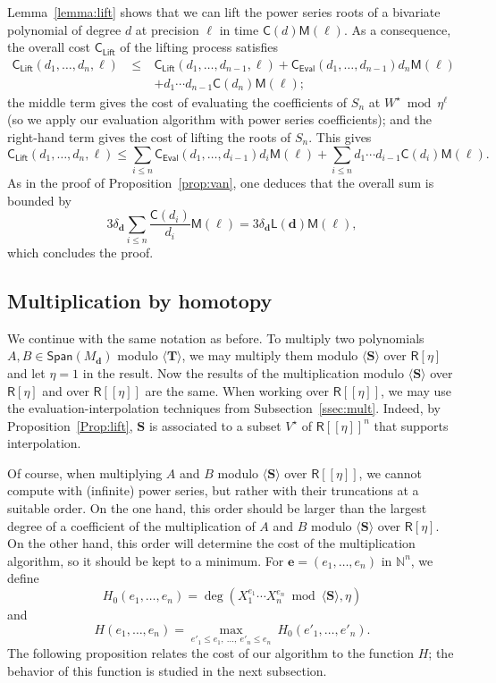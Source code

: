 \documentclass[amsthm]{elsart}
\def\d {\ensuremath{\mathbf{d}}}
\def\e {\ensuremath{\mathbf{e}}}
\def\C {\ensuremath{\mathsf{C}}}
\def\L {\ensuremath{\mathsf{L}}}
\def\N {\ensuremath{\mathbb{N}}}
\def\S {\ensuremath{\mathbf{S}}}
\def\T {\ensuremath{\mathbf{T}}}
\def\M {\ensuremath{\mathsf{M}}}
\def\rng {\ensuremath{\mathsf{R}}}
\def\Span {\ensuremath{\mathsf{Span}}}
\def\Eval {\ensuremath{\mathsf{Eval}}}
\def\Lift {\ensuremath{\mathsf{Lift}}}
\theoremstyle{plain}
\begin{document}
\begin{pf}
Lemma~\ref{lemma:lift} shows that we can lift the power series roots
of a bivariate polynomial of degree $d$ at precision $\ell$ in time
$\C(d)\M(\ell)$. As a consequence, the overall cost $\C_\Lift$ of the
lifting process satisfies
$$
\begin{array}{rcl}
\C_\Lift(d_1,\dots,d_n,\ell) & ~\le~&  
\C_\Lift(d_1,\dots,d_{n-1},\ell) + 
\C_\Eval(d_1,\dots,d_{n-1}) d_n \M(\ell)\\
&&+d_1\cdots d_{n-1} \C(d_n) \M(\ell);
\end{array}
$$
the middle term gives the cost of evaluating the coefficients of $S_n$
at $W^\star \bmod \eta^\ell$ (so we apply our evaluation algorithm
with power series coefficients); and the right-hand term gives the
cost of lifting the roots of $S_n$.  This gives
$$\C_\Lift(d_1,\dots,d_n,\ell)\le 
\sum_{i \le n} \C_\Eval(d_1,\dots,d_{i-1}) d_i \M(\ell) + \sum_{i \le
  n} d_1\cdots d_{i-1} \C(d_i) \M(\ell).$$ As in the proof of
Proposition~\ref{prop:van}, one deduces that the overall sum is bounded by
$$3   \delta_\d\sum_{i \le n} \frac{\C(d_i)}{d_i}\M(\ell)
= 3   \delta_\d \L(\d)\M(\ell),$$
which concludes the proof.
\end{pf}



\subsection{Multiplication by homotopy}\label{ssec:prodEta}

We continue with the same notation as before. To multiply two
polynomials $A,B \in \Span(M_\d)$ modulo $\langle \T \rangle$,
we may multiply them modulo $\langle \S \rangle$ over $\rng[\eta]$ and
let $\eta=1$ in the result. Now the results of the multiplication modulo
$\langle \S \rangle$ over $\rng[\eta]$ and over $\rng[[\eta]]$ are the same.
When working over $\rng[[\eta]]$, we may use the evaluation-interpolation
techniques from Subsection~\ref{ssec:mult}. Indeed,
by Proposition~\ref{Prop:lift}, $\S$ is associated to a subset
${V^\star}$ of $\rng[[\eta]]^n$ that supports interpolation.

Of course, when multiplying $A$ and $B$ modulo $\langle \S \rangle$
over $\rng[[\eta]]$, we cannot compute with (infinite) power series,
but rather with their truncations at a suitable order.  On the one
hand, this order should be larger than the largest degree of a
coefficient of the multiplication of $A$ and $B$ modulo $\langle \S
\rangle$ over $\rng[\eta]$. On the other hand, this order will
determine the cost of the multiplication algorithm, so it should be
kept to a minimum.  For $\e=(e_1,\dots,e_n)$ in $\N^n$, we define
$$ H_0(e_1,\dots,e_n) =
   \deg(X_1^{e_1}\cdots X_n^{e_n} \bmod \langle \S \rangle, \eta)$$
and
$$ H(e_1,\dots,e_n) =
   \max_{e'_1 \le e_1,\ \dots,\ e'_n \le e_n}\ H_0(e'_1,\dots,e'_n).$$ 
The following proposition relates the cost of our algorithm to
the function $H$; the behavior of this function is
studied in the next subsection.
\end{document}
